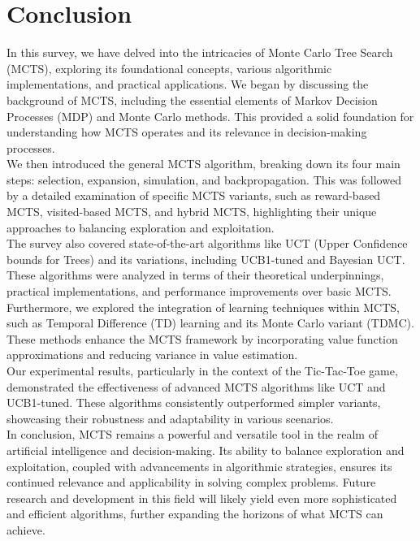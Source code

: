 \documentclass[11pt]{article}
\theoremstyle{definitionstyle}
\begin{document}
\section{Conclusion}
In this survey, we have delved into the intricacies of Monte Carlo Tree Search (MCTS), exploring its foundational concepts, various algorithmic implementations, and practical applications. We began by discussing the background of MCTS, including the essential elements of Markov Decision Processes (MDP) and Monte Carlo methods. This provided a solid foundation for understanding how MCTS operates and its relevance in decision-making processes.\\
We then introduced the general MCTS algorithm, breaking down its four main steps: selection, expansion, simulation, and backpropagation. This was followed by a detailed examination of specific MCTS variants, such as reward-based MCTS, visited-based MCTS, and hybrid MCTS, highlighting their unique approaches to balancing exploration and exploitation.\\
The survey also covered state-of-the-art algorithms like UCT (Upper Confidence bounds for Trees) and its variations, including UCB1-tuned and Bayesian UCT. These algorithms were analyzed in terms of their theoretical underpinnings, practical implementations, and performance improvements over basic MCTS.\\
Furthermore, we explored the integration of learning techniques within MCTS, such as Temporal Difference (TD) learning and its Monte Carlo variant (TDMC). These methods enhance the MCTS framework by incorporating value function approximations and reducing variance in value estimation.\\
Our experimental results, particularly in the context of the Tic-Tac-Toe game, demonstrated the effectiveness of advanced MCTS algorithms like UCT and UCB1-tuned. These algorithms consistently outperformed simpler variants, showcasing their robustness and adaptability in various scenarios.\\
In conclusion, MCTS remains a powerful and versatile tool in the realm of artificial intelligence and decision-making. Its ability to balance exploration and exploitation, coupled with advancements in algorithmic strategies, ensures its continued relevance and applicability in solving complex problems. Future research and development in this field will likely yield even more sophisticated and efficient algorithms, further expanding the horizons of what MCTS can achieve.


\end{document}
